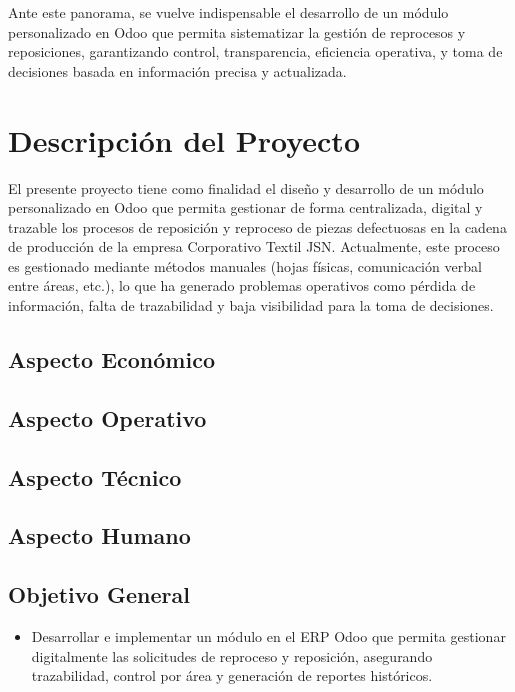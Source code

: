 \documentclass[12pt,letterpaper,spanish]{report}
\begin{document}
Ante este panorama, se vuelve indispensable el desarrollo de un módulo personalizado en Odoo que permita sistematizar la gestión de reprocesos y reposiciones, garantizando control, transparencia, eficiencia operativa, y toma de decisiones basada en información precisa y actualizada.



\section{Descripción del Proyecto}

El presente proyecto tiene como finalidad el diseño y desarrollo de un módulo personalizado en Odoo que permita gestionar de forma centralizada, digital y trazable los procesos de reposición y reproceso de piezas defectuosas en la cadena de producción de la empresa Corporativo Textil JSN. Actualmente, este proceso es gestionado mediante métodos manuales (hojas físicas, comunicación verbal entre áreas, etc.), lo que ha generado problemas operativos como pérdida de información, falta de trazabilidad y baja visibilidad para la toma de decisiones.

\subsection*{Aspecto Económico}


\subsection*{Aspecto Operativo}


\subsection*{Aspecto Técnico}


\subsection*{Aspecto Humano}



\subsection{Objetivo General}
\begin{itemize}
\item Desarrollar e implementar un módulo en el ERP Odoo que permita gestionar digitalmente las solicitudes de reproceso y reposición, asegurando trazabilidad, control por área y generación de reportes históricos.
\end{itemize}
\end{document}
